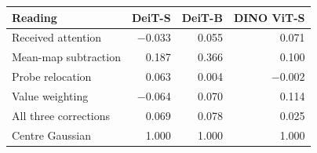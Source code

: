 \begin{tabular}{@{}lrrr@{}}
\toprule
Reading & DeiT-S & DeiT-B & DINO ViT-S\\
\midrule
Received attention & $-$0.033 & 0.055 & 0.071 \\
Mean-map subtraction & 0.187 & 0.366 & 0.100 \\
Probe relocation & 0.063 & 0.004 & $-$0.002 \\
Value weighting & $-$0.064 & 0.070 & 0.114 \\
All three corrections & 0.069 & 0.078 & 0.025 \\
\midrule
Centre Gaussian & 1.000 & 1.000 & 1.000 \\
\bottomrule
\end{tabular}
